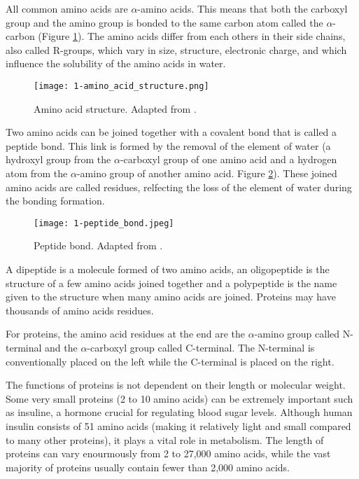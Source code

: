 All common amino acids are $\alpha$-amino acids. This means that both the carboxyl group and the amino group is bonded to the same carbon atom called the $\alpha$-carbon (Figure \ref{fig:aastructure}). The amino acids differ from each others in their side chains, also called R-groups, which vary in size, structure, electronic charge, and which influence the solubility of the amino acids in water.

\begin{figure}
  \centering
  \texttt{[image: 1-amino\_acid\_structure.png]}
  \caption{Amino acid structure. Adapted from \citeauthor{BYJUsAminoAcidsStructure}.}
  \label{fig:aastructure}
\end{figure}

Two amino acids can be joined together with a covalent bond that is called a peptide bond. This link
is formed by the removal of the element of water (a hydroxyl group from the $\alpha$-carboxyl group
of one amino acid and a hydrogen atom from the $\alpha$-amino group of another amino acid. Figure 
\ref{fig:peptidebond}). These joined amino acids are called residues, relfecting the loss of the element
of water during the bonding formation.

\begin{figure}
  \centering
  \texttt{[image: 1-peptide\_bond.jpeg]}
  \caption{Peptide bond. Adapted from \citeauthor{ChemistryLearnerPeptideBond}.}
  \label{fig:peptidebond}
\end{figure}

A dipeptide is a molecule formed of two amino acids, an oligopeptide is the structure of a few amino acids joined together and a polypeptide is the name given to the structure when many amino acids are joined. Proteins may have thousands of amino acids residues.

For proteins, the amino acid residues at the end are the $\alpha$-amino group called N-terminal and 
the $\alpha$-carboxyl group called C-terminal. The N-terminal is conventionally placed on the left while
the C-terminal is placed on the right.

The functions of proteins is not dependent on their length or molecular weight. \cite{Alberts2002ProteinFunction} Some very small proteins (2 to 10 amino acids) can be extremely important such as insuline, a hormone crucial for regulating blood sugar levels. Although human insulin consists of 51 amino acids (making it relatively light and small compared to many other proteins), it plays a vital role in metabolism. \cite{Steiner1985} The length of proteins can vary enourmously from 2 to 27,000 amino acids, while the vast majority of proteins usually contain fewer than 2,000 amino acids.

